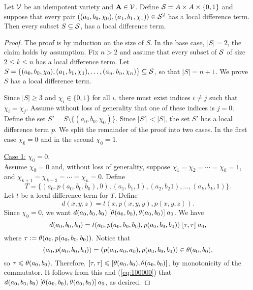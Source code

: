 \begin{thm}
  Let $\mathcal{V}$ be an idempotent variety and
  $\mathbf{A} \in \mathcal{V}$. Define
  $\mathcal{S}= A \times A \times \{0,1\}$
  and suppose that every pair
  $((a_0, b_0, \chi_0), (a_1, b_1, \chi_1)) \in \mathcal{S}^2$
  has a local difference term.
  Then every subset $S \subseteq \mathcal{S}$,
  has a local difference term.
\end{thm}
\begin{proof}
The proof is by induction on the size of $S$.  In the base case, $|S| = 2$,
the claim holds by assumption.
Fix $n>2$ and assume that every subset of $\mathcal{S}$ of size $2\leq k \leq n$ has a local
difference term. Let
$S = \{(a_0, b_0, \chi_0), (a_1, b_1, \chi_1), \dots, (a_{n}, b_{n},\chi_{n})\} \subseteq \mathcal{S}$,
so that $|S| = n+1$.  We prove $S$ has a local difference term.

Since $|S| \geq 3$ and $\chi_i \in \{0,1\}$ for all $i$, there must exist
indices $i\neq j$ such that $\chi_i = \chi_j$. Assume without loss of generality
that one of these indices is $j=0$.  Define
the set
$S' = S \setminus \{(a_0, b_0, \chi_0)\}$.
Since $|S'| < |S|$, the set $S'$ has a local difference term $p$.
We split the remainder of the proof into two cases. In the first case
$\chi_0 = 0$ and in the second
$\chi_0 = 1$.

\vskip3mm

\noindent \underline{Case 1:} $\chi_0 = 0$.
\\[4pt]
Assume $\chi_0 = 0$ and, 
without loss of generality, suppose $\chi_1 = \chi_2 =\cdots =\chi_k = 1$,
and $\chi_{k+1} = \chi_{k+2} = \cdots = \chi_{n} = 0$. Define
\[
T = \{(a_0, p(a_0, b_0, b_0), 0),
(a_1, b_1, 1), (a_2, b_2 1), \dots, (a_k, b_k, 1)\}.
\]
Let $t$ be a local difference term for $T$.
Define
\[
d(x,y,z) = t(x, p(x,y,y), p(x,y,z)).
\]
Since $\chi_0 =0$, we want $d(a_0,b_0,b_0)\mathrel{[\operatorname{\theta}(a_0,b_0), \operatorname{\theta}(a_0,b_0)]} a_0$.
We have
\begin{equation}
    \label{eq:100000}
  d(a_0,b_0,b_0) =
  t(a_0, p(a_0,b_0,b_0), p(a_0,b_0,b_0))\comm{\tau}{\tau} a_0,
\end{equation}
where $\tau:=\operatorname{\theta}(a_0, p(a_0,b_0,b_0))$.
Notice that
\[
(a_0, p(a_0,b_0,b_0)) = (p(a_0,a_0,a_0), p(a_0,b_0,b_0)) \in \operatorname{\theta}(a_0, b_0),
\]
so $\tau\leqslant \operatorname{\theta}(a_0,b_0)$. Therefore, 
$\mathrel{[\tau, \tau]} {\leqslant} \mathrel{[\operatorname{\theta}(a_0,b_0), \operatorname{\theta}(a_0,b_0)]}$,
by monotonicity of the commutator.
It follows from this and (\ref{eq:100000}) that
$d(a_0,b_0,b_0)\mathrel{[\operatorname{\theta}(a_0,b_0), \operatorname{\theta}(a_0,b_0)]} a_0$,
as desired.


\end{proof}

